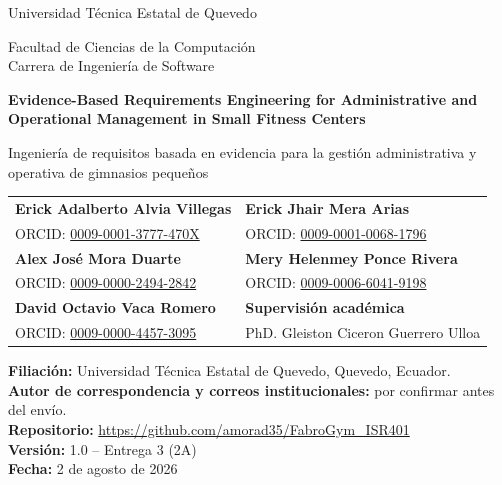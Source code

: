 \documentclass[11pt,a4paper]{article}
\begin{document}
\begin{titlepage}
\centering
{\Large Universidad Técnica Estatal de Quevedo\par}
\vspace{0.2cm}
{\large Facultad de Ciencias de la Computación\\Carrera de Ingeniería de Software\par}
\vspace{1.4cm}
{\LARGE\bfseries Evidence-Based Requirements Engineering for Administrative and Operational Management in Small Fitness Centers\par}
\vspace{0.45cm}
{\Large Ingeniería de requisitos basada en evidencia para la gestión administrativa y operativa de gimnasios pequeños\par}
\vspace{1.2cm}

\begin{tabular}{p{}p{}}
\textbf{Erick Adalberto Alvia Villegas} & \textbf{Erick Jhair Mera Arias}\\
ORCID: \href{https://orcid.org/0009-0001-3777-470X}{0009-0001-3777-470X} &
ORCID: \href{https://orcid.org/0009-0001-0068-1796}{0009-0001-0068-1796}\\[0.35cm]
\textbf{Alex José Mora Duarte} & \textbf{Mery Helenmey Ponce Rivera}\\
ORCID: \href{https://orcid.org/0009-0000-2494-2842}{0009-0000-2494-2842} &
ORCID: \href{https://orcid.org/0009-0006-6041-9198}{0009-0006-6041-9198}\\[0.35cm]
\textbf{David Octavio Vaca Romero} & \textbf{Supervisión académica}\\
ORCID: \href{https://orcid.org/0009-0000-4457-3095}{0009-0000-4457-3095} &
PhD. Gleiston Ciceron Guerrero Ulloa\\
\end{tabular}

\vfill
\textbf{Filiación:} Universidad Técnica Estatal de Quevedo, Quevedo, Ecuador.\\
\textbf{Autor de correspondencia y correos institucionales:} por confirmar antes del envío.\\
\textbf{Repositorio:} \url{https://github.com/amorad35/FabroGym_ISR401}\\
\textbf{Versión:} 1.0 -- Entrega 3 (2A)\\
\textbf{Fecha:} 2 de agosto de 2026
\end{titlepage}
\end{document}
